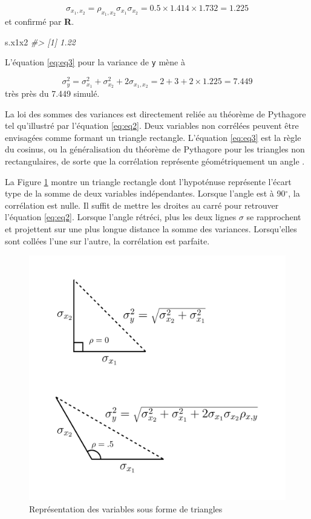 \documentclass[
]{book}
\newenvironment{Shaded}{}{}
\newcommand{\CommentTok}[1]{\textit{#1}}
\newcommand{\NormalTok}[1]{#1}
\begin{document}
\[\sigma_{x_1,x_2} = \rho_{x_1,x_2} \sigma_{x_1} \sigma_{x_2} = 0.5 \times 1.414 \times 1.732 = 1.225\]
et confirmé par \textbf{R}.

\begin{Shaded}
\begin{Highlighting}[]
\NormalTok{s.x1x2}
\CommentTok{\#\textgreater{} [1] 1.22}
\end{Highlighting}
\end{Shaded}

L'équation \eqref{eq:eq3} pour la variance de \texttt{y} mène à

\[\sigma_y^2=\sigma_{x_1}^2+\sigma_{x_2}^2+2\sigma_{x_1,x_2}= 2+3 + 2 \times 1.225  = 7.449\]
très près du 7.449 simulé.

La loi des sommes des variances est directement reliée au théorème de Pythagore tel qu'illustré par l'équation \eqref{eq:eq2}. Deux variables non corrélées peuvent être envisagées comme formant un triangle rectangle. L'équation \eqref{eq:eq3} est la règle du cosinus, ou la généralisation du théorème de Pythagore pour les triangles non rectangulaires, de sorte que la corrélation représente géométriquement un angle \autocite{Rodgers88}.

La Figure \ref{fig:tri1111} montre un triangle rectangle dont l'hypoténuse représente l'écart type de la somme de deux variables indépendantes. Lorsque l'angle est à 90\(^\circ\), la corrélation est nulle. Il suffit de mettre les droites au carré pour retrouver l'équation \eqref{eq:eq2}. Lorsque l'angle rétréci, plus les deux lignes \(\sigma\) se rapprochent et projettent sur une plus longue distance la somme des variances. Lorsqu'elles sont collées l'une sur l'autre, la corrélation est parfaite.

\begin{figure}

{\centering \includegraphics[width=0.75\linewidth,height=0.75\textheight]{image//tri} 

}

\caption{Représentation des variables sous forme de triangles}\label{fig:tri1111}
\end{figure}
\end{document}
